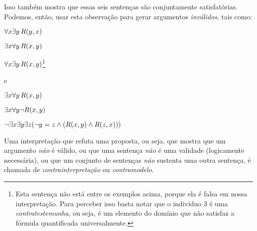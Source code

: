 Isso também mostra que essas seis sentenças são conjuntamente satisfatórias.
Podemos, então, usar esta observação para gerar argumentos \emph{inválidos}, tais como:
\begin{earg}
	\item[] $\forall x \exists y\, \mathord{R}(y,x)$
	\item[] $\exists x \forall y\, \mathord{R}(x,y)$
	\item[\therefore] $\forall x \exists y\, \mathord{R}(x,y)$\footnote{
		Esta sentença não está entre os exemplos acima, porque ela é falsa em nossa interpretação.
		Para perceber isso basta notar que o indivíduo 3 é uma \textit{contratestemunha}, ou seja, é um elemento do domínio que não satisfaz a fórmula quantificada universalmente.}
\end{earg}
e
\begin{earg}
	\item[] $\exists x \forall y\, \mathord{R}(x,y)$
	\item[] $\exists x \forall y \neg \mathord{R}(x,y)$
	\item[\therefore] $\neg \exists x \exists y \exists z (\neg y = z \wedge (\mathord{R}(x,y) \wedge \mathord{R}(z,x)))$
\end{earg}

Uma interpretação que refuta uma proposta, ou seja, que mostra que um argumento \emph{não} é válido, ou que uma sentença \emph{não} é uma validade (logicamente necessária), ou que um conjunto de sentenças \emph{não} sustenta uma outra sentença, é chamada de \emph{contrainterpretação} ou \emph{contramodelo}.



\practiceproblems


